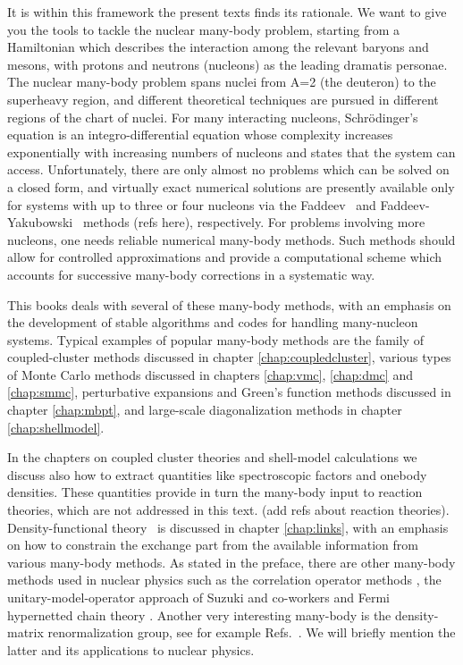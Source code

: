 It is within this framework the present texts finds its rationale.  We
want to give you the tools to tackle the nuclear many-body problem,
starting from a Hamiltonian which describes the interaction among the
relevant baryons and mesons, with protons and neutrons (nucleons) as
the leading dramatis personae.  The nuclear many-body problem spans
nuclei from A=2 (the deuteron) to the superheavy region, and different
theoretical techniques are pursued in different regions of the chart
of nuclei.  For many interacting nucleons, Schr\"odinger's equation is
an integro-differential equation whose complexity increases
exponentially with increasing numbers of nucleons and states that the
system can access.  Unfortunately, there are only almost no problems
which can be solved on a closed form, and virtually exact numerical
solutions are presently available only for systems with up to three or
four nucleons via the Faddeev~\cite{Faddeev} and
Faddeev-Yakubowski~\cite{FY} methods (refs here), respectively. For
problems involving more nucleons, one needs reliable numerical
many-body methods. Such methods should allow for controlled
approximations and provide a computational scheme which accounts for
successive many-body corrections in a systematic way.

This books deals with several of these many-body methods, with an
emphasis on the development of stable algorithms and codes for
handling many-nucleon systems.  Typical examples of popular many-body
methods are the family of coupled-cluster methods
\cite{bartlett2007,dean2004,helgaker,hagen2007a,hagen2007b,hagen2007c}
discussed in chapter \ref{chap:coupledcluster}, various types of Monte
Carlo methods \cite{Pudliner1997,kdl97,ceperley1995,utsuno1999}
discussed in chapters \ref{chap:vmc}, \ref{chap:dmc} and
\ref{chap:smmc}, perturbative expansions \cite{ellis1977,mhj95} and
Green's function methods \cite{barbieri2004} discussed in chapter
\ref{chap:mbpt}, and large-scale diagonalization methods
\cite{Whitehead1977,caurier2005,dean2004b,navratil2004,horoi2006} in
chapter \ref{chap:shellmodel}.


In the chapters on coupled cluster theories and shell-model
calculations we discuss also how to extract quantities like
spectroscopic factors and onebody densities. These quantities provide
in turn the many-body input to reaction theories, which are not
addressed in this text. (add refs about reaction theories).
Density-functional theory~\cite{bartlett2005,peirs2003,vanneck2006} is
discussed in chapter \ref{chap:links}, with an emphasis on how to
constrain the exchange part from the available information from
various many-body methods.  As stated in the preface, there are other
many-body methods used in nuclear physics such as the correlation
operator methods \cite{japanese,feldmeier}, the unitary-model-operator
approach of Suzuki and co-workers \cite{Fujii2004,Fujii2004b} and
Fermi hypernetted chain theory \cite{adelchi,co2007}.  Another very
interesting many-body is the density-matrix renormalization group, see
for example
Refs.~\cite{white1992,schollwock2005,dukelsky2002a,pittel2006}.  We
will briefly mention the latter and its applications to nuclear
physics.


